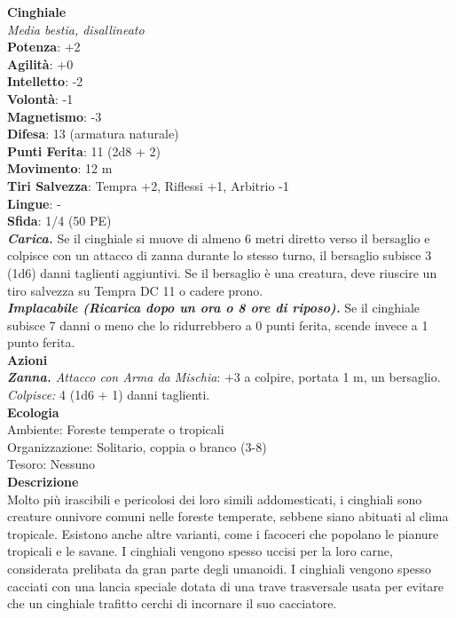 \begin{multicols}{2}
\medskip\textbf{Cinghiale}\\
\emph{Media bestia, disallineato}\\
\textbf{Potenza}: +2\\
\textbf{Agilità}: +0\\
\textbf{Intelletto}: -2\\
\textbf{Volontà}: -1\\
\textbf{Magnetismo}: -3\\
\textbf{Difesa}: 13 (armatura naturale)\\
\textbf{Punti Ferita}: 11 (2d8 + 2)\\
\textbf{Movimento}: 12 m\\
\textbf{Tiri Salvezza}: Tempra +2, Riflessi +1, Arbitrio -1 \\
\textbf{Lingue}: -\\
\textbf{Sfida}: 1/4 (50 PE)\smallskip\\
\emph{\textbf{Carica.}} Se il cinghiale si muove di almeno 6 metri diretto verso il bersaglio e colpisce con un attacco di zanna durante lo stesso turno, il bersaglio subisce 3 (1d6) danni taglienti aggiuntivi. Se il bersaglio è una creatura, deve riuscire un tiro salvezza su Tempra DC 11 o cadere prono.\\
\emph{\textbf{Implacabile (Ricarica dopo un ora o 8 ore di riposo).}} Se il cinghiale subisce 7 danni o meno che lo ridurrebbero a 0 punti ferita, scende invece a 1 punto ferita.\\
\smallskip\textbf{Azioni}\\
\emph{\textbf{Zanna.} Attacco con Arma da Mischia}: +3 a colpire, portata 1 m, un bersaglio.\\
\emph{Colpisce:} 4 (1d6 + 1) danni taglienti. \\
\textbf{Ecologia}\\
Ambiente: Foreste temperate o tropicali\\
Organizzazione: Solitario, coppia o branco (3-8)\\
Tesoro: Nessuno\\
\textbf{Descrizione}\\

Molto più irascibili e pericolosi dei loro simili addomesticati, i cinghiali sono creature onnivore comuni nelle foreste temperate, sebbene siano abituati al clima tropicale. Esistono anche altre varianti, come i facoceri che popolano le pianure tropicali e le savane. I cinghiali vengono spesso uccisi per la loro carne, considerata prelibata da gran parte degli umanoidi. I cinghiali vengono spesso cacciati con una lancia speciale dotata di una trave trasversale usata per evitare che un cinghiale trafitto cerchi di incornare il suo cacciatore.\\


\end{multicols}
